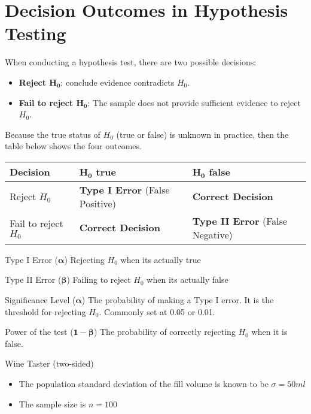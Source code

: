 \documentclass[10pt]{extarticle}
\begin{document}
\section{Decision Outcomes in Hypothesis Testing}
When conducting a hypothesis test, there are two possible decisions:
\begin{itemize}
    \item \textbf{Reject $\boldsymbol{H_0}$}: conclude evidence contradicts $H_0$.
    \item \textbf{Fail to reject $\boldsymbol{H_0}$}: The sample does not provide sufficient evidence to reject $H_0$.
\end{itemize}
\noindent Because the true status of $H_0$ (true or false) is unknown in practice, then the table below shows the four outcomes.
\begin{center}
    \begin{tabularx}{\textwidth}{@{} X X X @{}}
        \toprule
        \textbf{Decision} & \textbf{$\boldsymbol{H_0}$ true} & \textbf{$\boldsymbol{H_0}$ false} \\
        \midrule
        Reject $H_0$ & \textbf{Type I Error} (False Positive) & \textbf{Correct Decision} \\
        \addlinespace[2ex]
        Fail to reject $H_0$ & \textbf{Correct Decision} & \textbf{Type II Error} (False Negative) \\
        \bottomrule
    \end{tabularx}
\end{center}
\begin{definitionbox}{Type I Error ($\boldsymbol{\alpha}$)}{}
    Rejecting $H_0$ when its actually true
\end{definitionbox}
\begin{definitionbox}{Type II Error ($\boldsymbol{\beta}$)}{}
    Failing to reject $H_0$ when its actually false
\end{definitionbox}
\begin{definitionbox}{Significance Level ($\boldsymbol{\alpha}$)}{}
    The probability of making a Type I error. It is the threshold for rejecting $H_0$. Commonly set at 0.05 or 0.01.
\end{definitionbox}
\begin{definitionbox}{Power of the test ($\boldsymbol{1 - \beta}$)}{}
    The probability of correctly rejecting $H_0$ when it is false.
\end{definitionbox}
\begin{examplebox}{Wine Taster (two-sided)}{}
    \begin{itemize}
        \item The population standard deviation of the fill volume is known to be $\sigma = 50ml$
        \item The sample size is $n = 100$
    \end{itemize}
\end{examplebox}
\end{document}
